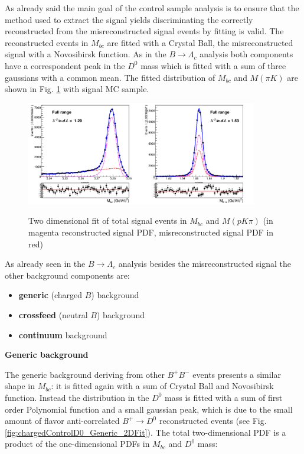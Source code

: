 As already said the main goal of the control sample analysis is to ensure that the method used to extract the signal yields discriminating the correctly reconstructed from the misreconstructed signal events by fitting is valid.
The reconstructed events in $M_{bc}$ are fitted with a Crystal Ball, the misreconstructed signal with a Novosibirsk function. As in the $B \rightarrow \Lambda_c$ analysis both components have a correspondent peak in the $D^0$ mass which 
is fitted with a sum of three gaussians with a common mean.
The fitted distribution of $M_{bc}$ and $M(\pi K)$ are shown in Fig. \ref{fig:chargedTotalSignal2Dfit} with signal MC sample. 

\begin{figure}[H]
{\includegraphics[width=0.90\textwidth]{05-chargedControlSample/figs/TotalSignal2Dfit_Mbc_free_Novosibirsk_and_CB_w_sig_frac.png}}
\caption{Two dimensional fit of total signal events in $M_{bc}$  and $M(p K \pi)$ (in magenta reconstructed signal PDF, misreconstructed signal PDF in red)}
\label{fig:chargedTotalSignal2Dfit}
\end{figure}

As already seen in the $B \rightarrow \Lambda_c$ analysis  besides the misreconstructed signal the other background components are:

\begin{itemize}
    \item \textbf{generic} (charged $B$) background
    \item \textbf{crossfeed} (neutral $B$) background 
    \item \textbf{continuum} background 
\end{itemize}
\vspace{0.2 cm}
\noindent \textbf{Generic background}

\noindent The generic background deriving from other $B^+B^-$ events presents a similar shape in $M_{bc}$: it is fitted again with a sum of Crystal Ball and Novosibirsk function. Instead the distribution in  the $D^0$ mass  is fitted with a sum of first order Polynomial function and a small gaussian peak, which is due to the small 
amount of flavor anti-correlated $B^+ \rightarrow D^0$ reconstructed events (see Fig. \ref{fig:chargedControlD0_Generic_2DFit}). The total two-dimensional PDF is a product of the one-dimensional PDFs in $M_{bc}$ and $D^0$ mass:

